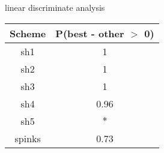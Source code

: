 \begin{subtable}[b]{0.3\linewidth}
  \caption{linear discriminate analysis}
  \centering
  \begin{tabular}{ c c }
    \hline
    Scheme & P(best - other \(>\) 0) \\ 
    \hline
    \hline
    sh1 & 1 \\
    sh2 & 1 \\
    sh3 & 1 \\ 
    sh4 & 0.96 \\ 
    sh5 & \(\ast\) \\ 
    spinks & 0.73 \\ 
    \hline
  \end{tabular}
  \label{lldif}
\end{subtable}
